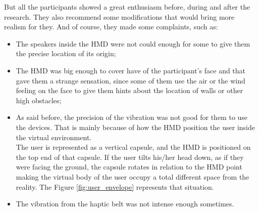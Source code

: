 But all the participants showed a great enthusiasm before, during and after the research. They also recommend some modifications that would bring more realism for they. And of course, they made some complaints, such as:

\begin{itemize}
    \item The speakers inside the HMD were not could enough for some to give them the precise location of its origin;
    \item The HMD was big enough to cover have of the participant’s face and that gave them a strange sensation, since some of them use the air or the wind feeling on the face to give them hints about the location of walls or other high obstacles;
    \item As said before, the precision of the vibration was not good for them to use the devices. That is mainly because of how the HMD position the user inside the virtual environment. \\
    The user is represented as a vertical capsule, and the HMD is positioned on the top end of that capsule. If the user tilts his/her head down, as if they were facing the ground, the capsule rotates in relation to the HMD point making the virtual body of the user occupy a total different space from the reality. The Figure \ref{fig:user_envelope} represents that situation. 

    
    \item The vibration from the haptic belt was not intense enough sometimes.
\end{itemize}

